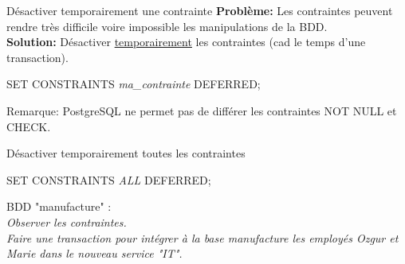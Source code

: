 \documentclass[dvipsnames]{beamer}
\begin{document}


\begin{frame}{Désactiver temporairement une contrainte}
	\textbf{Problème:} Les contraintes peuvent rendre très difficile voire impossible les manipulations de la BDD.\\
	\textbf{Solution:} Désactiver \underline{temporairement} les contraintes (cad le temps d'une transaction).
	\begin{alertblock}{}
		SET CONSTRAINTS \textit{ma\_contrainte} DEFERRED;
	\end{alertblock}
		
	\begin{footnotesize}
		Remarque: PostgreSQL ne permet pas de différer les contraintes NOT NULL et CHECK.\\
	\end{footnotesize}
	\vspace{1em}
	
\end{frame}

\begin{frame}{Désactiver temporairement toutes les contraintes}
	\begin{alertblock}{}
		SET CONSTRAINTS \textit{ALL} DEFERRED;
	\end{alertblock}
	
	\begin{scriptsize}
	BDD "manufacture" :\\
	\textit{Observer les contraintes.}\\
	\textit{Faire une transaction pour intégrer à la base \textit{manufacture} les employés Ozgur et Marie dans le nouveau service "IT".}
	\end{scriptsize}
\end{frame}
\end{document}
